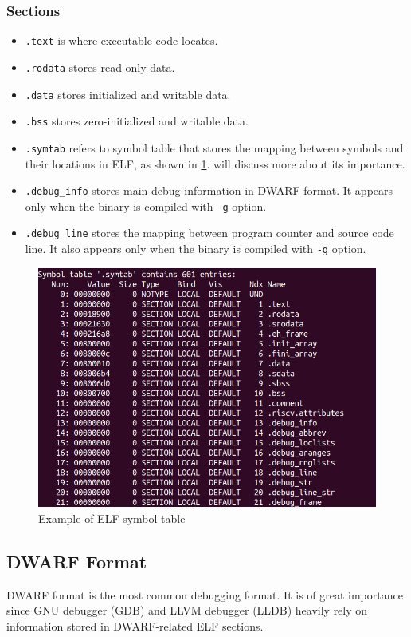 \subsubsection{Sections}

\begin{itemize}
    \item \texttt{.text} is where executable code locates.
    \item \texttt{.rodata} stores read-only data.
    \item \texttt{.data} stores initialized and writable data.
    \item \texttt{.bss} stores zero-initialized and writable data.
    \item \texttt{.symtab} refers to symbol table that stores the mapping between symbols and their locations in \ac{ELF}, as shown in \cref{fig:elf_symbol_table}.  will discuss more about its importance.
    \item \texttt{.debug\_info} stores main debug information in DWARF format. It appears only when the binary is compiled with \texttt{-g} option.
    \item \texttt{.debug\_line} stores the mapping between program counter and source code line. It also appears only when the binary is compiled with \texttt{-g} option.
\end{itemize}

\begin{figure}[ht]
    \centering
    \includegraphics[width=.85\linewidth]{figures/ELF_symtab.png}
    \caption{Example of \ac{ELF} symbol table}
    \label{fig:elf_symbol_table}
\end{figure}

\subsection{DWARF Format}
DWARF format is the most common debugging format. It is of great importance since GNU debugger (GDB) and LLVM debugger (LLDB) heavily rely on information stored in DWARF-related \ac{ELF} sections.

